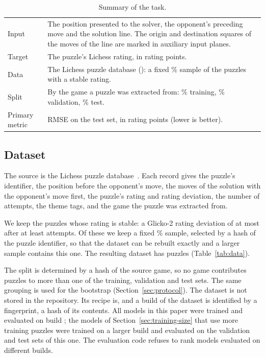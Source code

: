 \documentclass[11pt]{article}
\begin{document}
\begin{table}[htbp]\centering\small
\begin{tabularx}{\textwidth}{lL}
\toprule
Input & The position presented to the solver, the opponent's preceding move
and the solution line. The origin and destination squares of the moves of the
line are marked in auxiliary input planes. \\
Target & The puzzle's Lichess rating, in rating points. \\
Data & The Lichess puzzle database (): a fixed
\% sample of the puzzles with a stable rating. \\
Split & By the game a puzzle was extracted from: \%
training, \% validation, \% test. \\
Primary metric & RMSE on the test set, in rating points (lower is better). \\
\bottomrule
\end{tabularx}
\caption{Summary of the task.}
\label{tab:brief}
\end{table}

\subsection{Dataset}

The source is the Lichess puzzle database~\cite{lichessdb}. Each record gives
the puzzle's identifier, the position before the opponent's move, the moves
of the solution with the opponent's move first, the puzzle's rating and
rating deviation, the number of attempts, the theme tags, and the game the
puzzle was extracted from.

We keep the puzzles whose rating is stable: a Glicko-2 rating deviation of at
most  after at least
 attempts. Of these we keep a fixed
\% sample, selected by a hash of the puzzle
identifier, so that the dataset can be rebuilt exactly and a larger sample
contains this one. The resulting dataset has  puzzles
(Table~\ref{tab:data}).

The split is determined by a hash of the source game, so no game contributes
puzzles to more than one of the training, validation and test sets. The same
grouping is used for the bootstrap (Section~\ref{sec:protocol}). The dataset
is not stored in the repository. Its recipe is, and a build of the dataset is
identified by a fingerprint, a hash of its contents. All models in this paper
were trained and evaluated on build \ifmore; the models
of Section~\ref{sec:training-size} that use more training puzzles were
trained on a larger build and evaluated on the validation and test sets of
this one\fi. The evaluation code refuses to rank models evaluated on
different builds.
\end{document}
